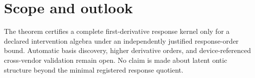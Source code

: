 \documentclass[aps,prl,reprint,superscriptaddress,nofootinbib]{revtex4-2}
\begin{document}
\section{Scope and outlook}
The theorem certifies a complete first-derivative response kernel only for a declared intervention algebra under an independently justified response-order bound.  Automatic basis discovery, higher derivative orders, and device-referenced cross-vendor validation remain open.  No claim is made about latent ontic structure beyond the minimal registered response quotient.
\end{document}

